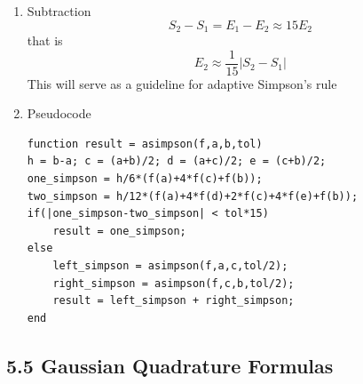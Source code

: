 \documentclass{article}
\theoremstyle{remark}
\begin{document}
\begin{enumerate}
\begin{enumerate}
\item Subtraction
$$
S_2-S_1 = E_1-E_2 \approx 15E_2
$$
that is
$$
E_2 \approx \frac{1}{15}|S_2-S_1|
$$
This will serve as a guideline for adaptive Simpson's rule

\item Pseudocode
\begin{verbatim}
function result = asimpson(f,a,b,tol)
h = b-a; c = (a+b)/2; d = (a+c)/2; e = (c+b)/2;
one_simpson = h/6*(f(a)+4*f(c)+f(b));
two_simpson = h/12*(f(a)+4*f(d)+2*f(c)+4*f(e)+f(b));
if(|one_simpson-two_simpson| < tol*15)
    result = one_simpson;
else
    left_simpson = asimpson(f,a,c,tol/2);
    right_simpson = asimpson(f,c,b,tol/2);
    result = left_simpson + right_simpson;
end
\end{verbatim}

\end{enumerate}
\end{enumerate}

\subsection{5.5 Gaussian Quadrature Formulas}
\end{document}
